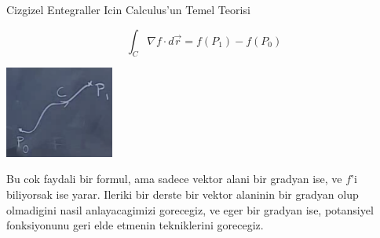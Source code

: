 \documentclass[12pt,fleqn]{article}
\begin{document}
Cizgizel Entegraller Icin Calculus'un Temel Teorisi

\[ \int_{C} \nabla f \cdot d\vec{r} = 
f(P_1) - f(P_0)
 \]

\includegraphics[height=3cm]{20_5.png}

Bu cok faydali bir formul, ama sadece vektor alani bir gradyan ise, ve
$f$'i biliyorsak ise yarar. Ileriki bir derste bir vektor alaninin bir
gradyan olup olmadigini nasil anlayacagimizi gorecegiz, ve eger bir gradyan
ise, potansiyel fonksiyonunu geri elde etmenin tekniklerini gorecegiz. 
\end{document}
